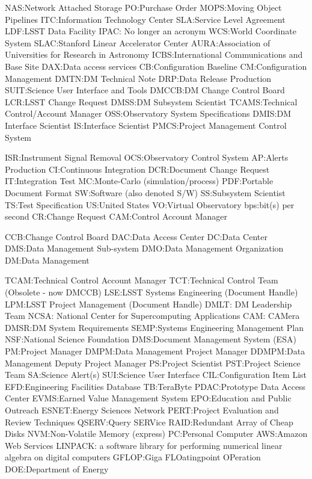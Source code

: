 NAS:Network Attached Storage
PO:Purchase Order
MOPS:Moving Object Pipelines
ITC:Information Technology Center
SLA:Service Level Agreement
LDF:LSST Data Facility
IPAC: No longer an acronym
WCS:World Coordinate System
SLAC:Stanford Linear Accelerator Center
AURA:Association of Universities for Research in Astronomy
ICBS:International Communications and Base Site
DAX:Data access services
CB:Configuration Baseline
CM:Configuration Management
DMTN:DM Technical Note
DRP:Data Release Production
SUIT:Science User Interface and Tools
DMCCB:DM Change Control Board
LCR:LSST Change Request
DMSS:DM Subsystem Scientist
TCAMS:Technical Control/Account Manager
OSS:Observatory System Specifications
DMIS:DM Interface Scientist
IS:Interface Scientist
PMCS:Project Management Control System

ISR:Instrument Signal Removal
OCS:Observatory Control System
AP:Alerts Production
CI:Continuous Integration
DCR:Document Change Request
IT:Integration Test
MC:Monte-Carlo (simulation/process)
PDF:Portable Document Format
SW:Software (also denoted S/W)
SS:Subsystem Scientist
TS:Test Specification
US:United States
VO:Virtual Observatory
bps:bit(s) per second
CR:Change Request
CAM:Control Account Manager

CCB:Change Control Board
DAC:Data Access Center
DC:Data Center
DMS:Data Management Sub-system
DMO:Data Management Organization
DM:Data Management

TCAM:Technical Control Account Manager
TCT:Technical Control Team (Obsolete - now DMCCB)
LSE:LSST Systems Engineering (Document Handle)
LPM:LSST Project Management (Document Handle)
DMLT: DM Leadership Team
NCSA: National Center for Supercomputing Applications
CAM: CAMera
DMSR:DM System Requirements
SEMP:Systems Engineering Management Plan
NSF:National Science Foundation
DMS:Document Management System (ESA)
PM:Project Manager
DMPM:Data Management Project Manager
DDMPM:Data Management Deputy Project Manager
PS:Project Scientist
PST:Project Science Team
SA:Science Alert(s)
SUI:Science User Interface
CIL:Configuration Item List
EFD:Engineering Facilities Database
TB:TeraByte
PDAC:Prototype Data Access Center
EVMS:Earned Value Management System
EPO:Education and Public Outreach
ESNET:Energy Sciences Network
PERT:Project Evaluation and Review Techniques
QSERV:Query SERVice
RAID:Redundant Array of Cheap Disks
NVM:Non-Volatile Memory (express)
PC:Personal Computer
AWS:Amazon Web Services
LINPACK:  a software library for performing numerical linear algebra on digital computers
GFLOP:Giga FLOatingpoint OPeration
DOE:Department of Energy

